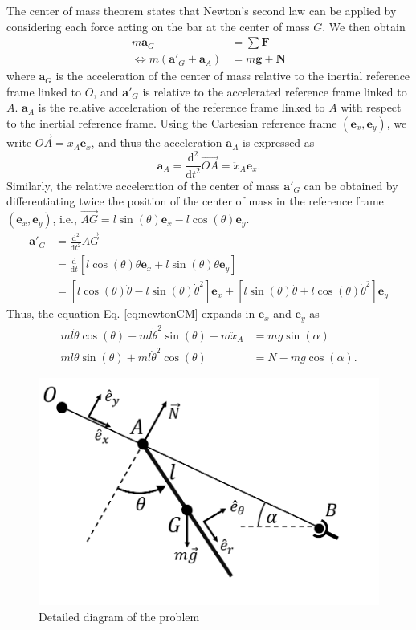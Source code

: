 \documentclass[11pt,a4paper]{exam}
\newcommand{\exACDH}{\bm e_x}
\newcommand{\eyACDH}{\bm e_y}
\begin{document}
\begin{parts}
    The center of mass theorem states that Newton's second law can be applied by considering each force acting on the bar at the center of mass $G$.
    We then obtain 
    \begin{align}
        m \bm a_G &= \sum \bm F \nonumber\\
        \Leftrightarrow m (\bm a'_G + \bm a_A) &= m\bm g + \bm N \label{eq:newtonCM}
    \end{align}
    where $\bm a_G$ is the acceleration of the center of mass relative to the inertial reference frame linked to $O$, and $\bm a'_G$ is relative to the accelerated reference frame linked to $A$. $\bm a_A$ is the relative acceleration of the reference frame linked to $A$ with respect to the inertial reference frame.
    Using the Cartesian reference frame $(\exACDH,\eyACDH)$, we write $\overrightarrow{OA}=x_A \exACDH$, and thus the acceleration $\bm a_A$ is expressed as
    \begin{equation}
        \bm a_A = \frac{\mathrm d^2}{\mathrm dt^2}\overrightarrow{OA}= \ddot x_A \exACDH.
    \end{equation}
    Similarly, the relative acceleration of the center of mass $\bm a'_G$ can be obtained by differentiating twice the position of the center of mass in the reference frame $(\exACDH,\eyACDH)$, i.e., $\overrightarrow{AG}=l\sin(\theta)\exACDH-l\cos(\theta)\eyACDH$.
    \begin{align}
        \bm a'_G &= \frac{\mathrm d^2}{\mathrm dt^2}\overrightarrow{AG}\nonumber\\
        &= \frac{\mathrm d}{\mathrm dt}\left[l\cos(\theta)\dot\theta \exACDH + l\sin(\theta)\dot\theta \eyACDH \right]\nonumber\\
        &= \left[l\cos(\theta)\ddot\theta  - l\sin(\theta)\dot\theta^2 \right]\exACDH +  \left[l\sin(\theta)\ddot\theta + l\cos(\theta)\dot\theta^2\right]\eyACDH
    \end{align}
    Thus, the equation Eq. \eqref{eq:newtonCM} expands in $\exACDH$ and $\eyACDH$ as
    \begin{align}
    ml\ddot\theta\cos(\theta) - ml\dot\theta^2 \sin(\theta)  + m\ddot x_A &= m g \sin(\alpha)\label{eq:newton_ex}\\
    ml\ddot\theta\sin(\theta) +ml \dot\theta^2\cos(\theta) &= N - mg\cos(\alpha) \label{eq:newton_ey}.
    \end{align}
    
     \begin{figure}
         \centering
         \includegraphics[width=0.5\linewidth]{ExoFig/tyr_schema_details.pdf}
         \caption{Detailed diagram of the problem}
         \label{fig:schema_details}
     \end{figure}


\end{parts}
\end{document}
